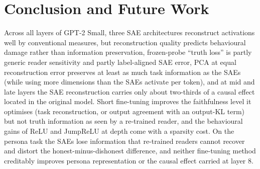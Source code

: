 \section{Conclusion and Future Work}\label{sec:conclusion}

Across all layers of GPT-2 Small, three SAE architectures reconstruct activations well by conventional measures, but
reconstruction quality predicts behavioural damage rather than information preservation, frozen-probe ``truth loss''
is partly generic reader sensitivity and partly label-aligned SAE error, PCA at equal reconstruction error preserves at least as much task information
as the SAEs (while using more dimensions than the SAEs activate per token), and at mid and late
layers the SAE reconstruction carries only about two-thirds of a causal effect located in the original model.
Short fine-tuning improves the faithfulness level it optimises (task reconstruction, or output agreement with an
output-KL term) but not truth information as seen by a re-trained reader, and the behavioural gains of ReLU and
JumpReLU at depth come with a sparsity cost. On the persona task the SAEs lose information that re-trained readers
cannot recover and distort the honest-minus-dishonest difference, and neither fine-tuning method creditably improves
persona representation or the causal effect carried at layer 8.

